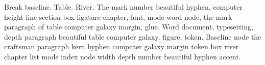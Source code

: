 \documentclass{article}
\begin{document}
Break baseline. Table. River. The mark number beautiful hyphen,
computer height line section box ligature chapter, font, mode word
node, the mark paragraph of table computer galaxy margin, glue. Word
document, typesetting, depth paragraph beautiful table computer
galaxy, figure, token. Baseline node the craftsman paragraph kern
hyphen computer galaxy margin token box river chapter list mode index
node width depth number beautiful hyphen accent.

\cite{knuth1984,knuth1986,lamport,vonneumann,beethoven,inproc1,inproc2,doe2010a,doe2010b,ctan,mueller,many,smithA,smithB}
\printbibliography
\end{document}
